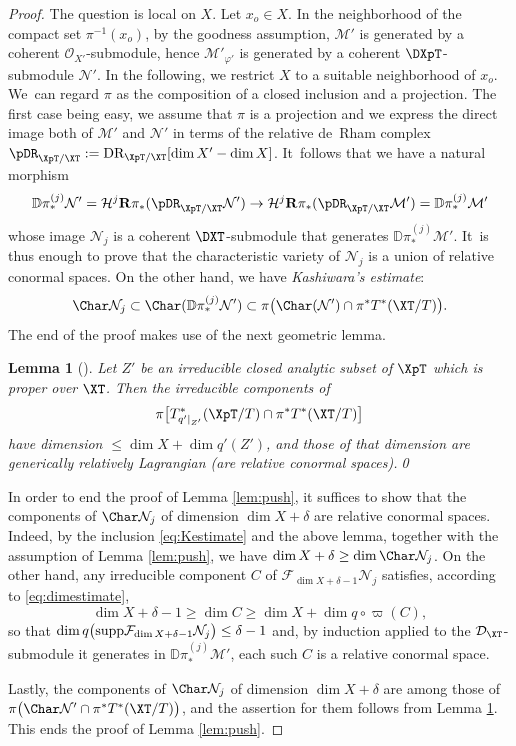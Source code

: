 \documentclass{amsart}
\theoremstyle{plain}
\numberwithin{theorem}{section}
\newtheorem{lemma}[theorem]{Lemma}
\theoremstyle{definition}
\theoremstyle{remark}
\theoremstyle{definition}
\newcommand{\D}{\mathbb{D}}
\newcommand{\cD}{\mathcal{D}}
\newcommand{\cF}{\mathcal{F}}
\newcommand{\cH}{\mathcal{H}}
\newcommand{\cM}{\mathcal{M}}
\newcommand{\cN}{\mathcal{N}}
\newcommand{\cO}{\mathscr{O}}
\newcommand{\bR}{\mathbf{R}}
\newcommand{\DR}{\textup{DR}}
\newcommand{\supp}{\textup{supp}}
\begin{document}
\begin{proof}
The question is local on $X$. Let $x_o\in X$. In the neighborhood of the compact set $\pi^{-1}(x_o)$, by the goodness assumption, $\cM'$ is generated by a coherent $\cO_{X'}$\nobreakdash-submodule, hence $\cM'_{\varphi'}$ is generated by a coherent $\DXpT$-submodule $\cN'$. In the following, we restrict $X$ to a suitable neighborhood of $x_o$. We~can regard $\pi$ as the composition of a closed inclusion and a projection. The first case being easy, we assume that $\pi$ is a projection and we express the direct image both of $\cM'$ and $\cN'$ in terms of the relative de~Rham complex $\pDR_{\XpT/\XT}:=\DR_{\XpT/\XT}[\dim X'-\dim X]$. It~follows that we have a natural morphism
\[
\D\pi_*^{(j)}\cN'=\cH^j\bR\pi_*(\pDR_{\XpT/\XT}\cN')\to\cH^j\bR\pi_*(\pDR_{\XpT/\XT}\cM')=\D\pi_*^{(j)}\cM'
\]
whose image $\cN_j$ is a coherent $\DXT$-submodule that generates $\D\pi_*^{(j)}\cM'$. It~is thus enough to prove that the characteristic variety of $\cN_j$ is a union of relative conormal spaces. On the other hand, we have \emph{Kashiwara's estimate}:
\begin{equation}\label{eq:Kestimate}
\Char\cN_j\subset \Char(\D\pi_*^{(j)}\cN')\subset\pi\bigl(\Char(\cN')\cap\pi^*T^*(\XT/T)\bigr).
\end{equation}
The end of the proof makes use of the next geometric  lemma.

\begin{lemma}[{\cite[Lem.\,3.5]{Sab2}}]\label{lem:relconormal}
Let $Z'$ be an irreducible closed analytic subset of $\XpT$ which is proper over $\XT$. Then the irreducible components of
\[
\pi\bigl[T^*_{q'|_{Z'}}(\XpT/T)\cap\pi^*T^*(\XT/T)\bigr]
\]
have dimension $\leq \dim X+\dim q'(Z')$, and those of that dimension are generically relatively Lagrangian (\ie are relative conormal spaces).\qed
\end{lemma}

In order to end the proof of Lemma \ref{lem:push}, it suffices to show that the components of $\Char\cN_j$ of dimension $\dim X+\delta$ are relative conormal spaces. Indeed, by the inclusion \eqref{eq:Kestimate} and the above lemma, together with the assumption of Lemma \ref{lem:push}, we have $\dim X+\delta\geq\dim\Char\cN_j$. On the other hand, any irreducible component $C$ of $\cF_{\dim X+\delta-1}\cN_j$ satisfies, according to \eqref{eq:dimestimate},
\[
\dim X+\delta-1\geq\dim C\geq\dim X+\dim q\circ\varpi(C),
\]
so that $\dim q\bigl(\supp\cF_{\dim X+\delta-1}\cN_j\bigr)\leq\delta-1$ and, by induction applied to the $\cD_{\XT}$-submodule it generates in $\D\pi^{(j)}_*\cM'$, each such $C$ is a relative conormal space.

Lastly, the components of $\Char\cN_j$ of dimension $\dim X+\delta$ are among those of $\pi\bigl(\Char\cN'\cap\pi^*T^*(\XT/T)\bigr)$, and the assertion for them follows from Lemma \ref{lem:relconormal}. This ends the proof of Lemma \ref{lem:push}.
\end{proof}
\end{document}
